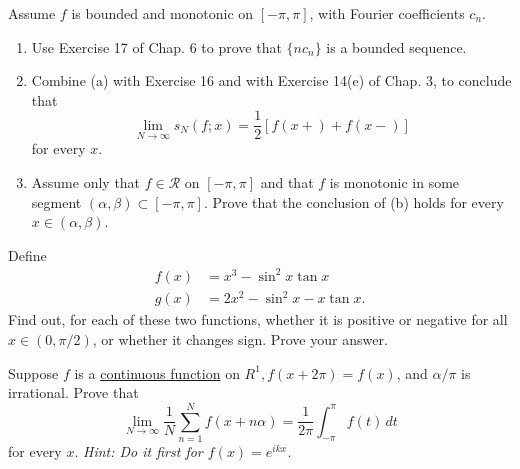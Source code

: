   \begin{exercise}[Rudin 8.17]
    Assume $f$ is bounded and monotonic on $[-\pi, \pi]$, with Fourier coefficients $c_n$.
    \begin{enumerate}
      \item Use Exercise 17 of Chap. 6 to prove that $\{nc_n\}$ is a bounded sequence.
      \item Combine (a) with Exercise 16 and with Exercise 14(e) of Chap. 3, to conclude that
        \begin{equation}
          \lim_{N \to \infty} s_N(f; x) = \frac{1}{2} [f(x+) + f(x-)]
        \end{equation}
        for every $x$.
      \item Assume only that $f \in \mathscr{R}$ on $[-\pi, \pi]$ and that $f$ is monotonic in some segment $(\alpha, \beta) \subset [-\pi, \pi]$. Prove that the conclusion of (b) holds for every $x \in (\alpha, \beta)$.
    \end{enumerate}
  \end{exercise}
  \begin{solution}

  \end{solution}

  \begin{exercise}[Rudin 8.18]
    Define
    \begin{align}
      f(x) &= x^3 - \sin^2 x \tan x \\
      g(x) &= 2x^2 - \sin^2 x - x \tan x.
    \end{align}
    Find out, for each of these two functions, whether it is positive or negative for all $x \in (0, \pi/2)$, or whether it changes sign. Prove your answer.
  \end{exercise}
  \begin{solution}

  \end{solution}

  \begin{exercise}[Rudin 8.19]
    Suppose $f$ is a \hyperref[pst-def:continuous_func]{continuous function} on $R^1, f(x+2\pi) = f(x)$, and $\alpha/\pi$ is irrational. Prove that
    \begin{equation}
      \lim_{N \to \infty} \frac{1}{N} \sum_{n=1}^N f(x + n\alpha) = \frac{1}{2\pi} \int_{-\pi}^\pi f(t) \, dt
    \end{equation}
    for every $x$. \textit{Hint: Do it first for $f(x) = e^{ikx}$.}
  \end{exercise}
  \begin{solution}

  \end{solution}

